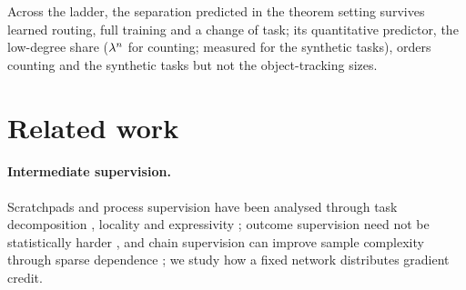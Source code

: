 Across the ladder, the separation predicted in the theorem setting survives learned routing, full training and a change of task; its
quantitative predictor, the low-degree share ($\lambda^n$ for counting; measured for the synthetic tasks), orders counting and the synthetic tasks but not the object-tracking sizes.

\section{Related work}
\label{sec:related}

\begin{table}[t]
\caption{\textbf{Positioning.} Entries summarize what each work proves, as described in the text.}
\label{tab:related}
\centering\footnotesize
{}
\end{table}

\paragraph{Intermediate supervision.} Scratchpads and process supervision
\citep{nye2021scratchpads,uesato2022solving,wei2022cot,lightman2023verify} have been analysed through task decomposition
\citep{wies2023subtask}, locality \citep{prystawski2023think,abbe2024globality} and expressivity
\citep{feng2023towards,merrill2024expressive,malach2023autoregressive}; outcome supervision need not be statistically
harder \citep{jia2025verify}, and chain supervision can improve sample complexity through sparse dependence
\citep{hanneke2026samplecomplexityautoregressivereasoning,wen2024sparse}; we study how a fixed network distributes gradient credit.

